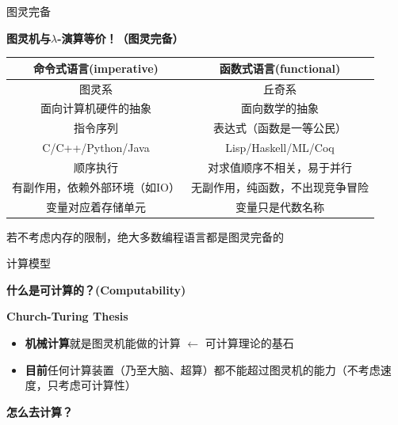 \documentclass[UTF8]{ctexbeamer}
\newcommand{\fontsm}{\fontsize{8}{9.2}\selectfont}
\begin{document}
\begin{frame}{图灵完备}
\begin{center}
\large\textbf{图灵机与$\lambda$-演算等价！（图灵完备）}
\end{center}
\pause
\begin{center}
\fontsm
\begin{tabular}{|c|c|}\hline
命令式语言(imperative) & 函数式语言(functional)\\\hline
图灵系 & 丘奇系 \\\hline
面向计算机硬件的抽象 & 面向数学的抽象\\\hline
指令序列 & 表达式（函数是一等公民）\\\hline
C/C++/Python/Java & Lisp/Haskell/ML/Coq\\\hline
顺序执行 & 对求值顺序不相关，易于并行\\
有副作用，依赖外部环境（如IO） & 无副作用，纯函数，不出现竞争冒险\\
变量对应着存储单元 & 变量只是代数名称\\\hline
\end{tabular}
\end{center}
\pause
若不考虑内存的限制，绝大多数编程语言都是图灵完备的
\end{frame}

\begin{frame}{计算模型}
\begin{center}
\Large\textbf{什么是可计算的？(Computability)}
\end{center}
\pause
\begin{center}
\Large\textbf{Church-Turing Thesis}\\
\end{center}
\begin{itemize}
	\item \textbf{机械计算}就是图灵机能做的计算 $\gets$ 可计算理论的基石 %
	\item \textbf{目前}任何计算装置（乃至大脑、超算）都不能超过图灵机的能力（不考虑速度，只考虑可计算性）
\end{itemize}
\end{frame}

\begin{frame}
\begin{center}
\Large\textbf{怎么去计算？}
\end{center}
\end{frame}
\end{document}
